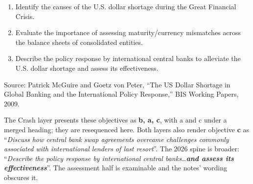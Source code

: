 
\begin{lrkeybox}
\begin{enumerate}[label=\textbf{\alph*.}]
\item Identify the causes of the U.S. dollar shortage during the Great Financial Crisis.
\item Evaluate the importance of assessing maturity/currency mismatches across the balance sheets of consolidated entities.
\item Describe the policy response by international central banks to alleviate the U.S. dollar shortage and assess its effectiveness.
\end{enumerate}
{\footnotesize\color{FRMGrey}Source: Patrick McGuire and Goetz von Peter, ``The US Dollar Shortage in Global Banking and the International Policy Response,'' BIS Working Papers, 2009.}
\end{lrkeybox}

\begin{lrtrapbox}
The Crash layer presents these objectives as \textbf{b, a, c}, with a and c under a merged heading; they are resequenced here. Both layers also render objective \textbf{c} as ``\emph{Discuss how central bank swap agreements overcame challenges commonly associated with international lenders of last resort}''. The 2026 spine is broader: ``\emph{Describe the policy response by international central banks\ldots \textbf{and assess its effectiveness}}''. The assessment half is examinable and the notes' wording obscures it.
\end{lrtrapbox}


